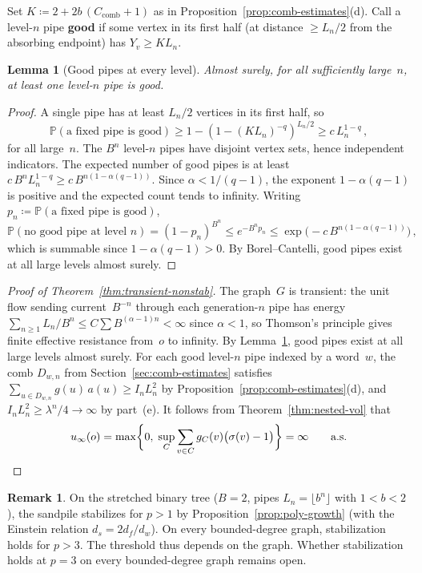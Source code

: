 \documentclass[aop]{imsart}
\theoremstyle{plain}
\newtheorem{lemma}[theorem]{Lemma}
\theoremstyle{definition}
\newtheorem{remark}[theorem]{Remark}
\renewcommand{\P}{\mathbb{P}}
\begin{document}
	Set $K\coloneqq 2+2b\,(C_{\mathrm{comb}}+1)$ as in Proposition~\ref{prop:comb-estimates}(d). Call a level-$n$ pipe \textbf{good} if some vertex in its first half (at distance $\geq L_n/2$ from the absorbing endpoint) has $Y_v\geq KL_n$.
	
	\begin{lemma}[Good pipes at every level]\label{lem:tr-good}
		Almost surely, for all sufficiently large~$n$, at least one level-$n$ pipe is good.
	\end{lemma}
	
	\begin{proof}
		A single pipe has at least $L_n/2$ vertices in its first half, so
		\[
		\P(\text{a fixed pipe is good})
		\geq 1-(1-(KL_n)^{-q})^{L_n/2}
		\geq c\,L_n^{1-q}\,,
		\]
		for all large~$n$. The $B^n$ level-$n$ pipes have disjoint vertex sets, hence independent indicators. The expected number of good pipes is at least $c\,B^n L_n^{1-q}\geq c\,B^{n(1-\alpha(q-1))}$. Since $\alpha<1/(q{-}1)$, the exponent $1-\alpha(q{-}1)$ is positive and the expected count tends to infinity. Writing $p_n\coloneqq\P(\text{a fixed pipe is good})$,
		\[
		\P(\text{no good pipe at level }n)
		=(1-p_n)^{B^n}
		\leq e^{-B^n p_n}
		\leq\exp\bigl(-c\,B^{n(1-\alpha(q-1))}\bigr)\,,
		\]
		which is summable since $1-\alpha(q{-}1)>0$. By Borel--Cantelli, good pipes exist at all large levels almost surely.
	\end{proof}
	
	\begin{proof}[Proof of Theorem~\ref{thm:transient-nonstab}]
		The graph~$G$ is transient: the unit flow sending current~$B^{-n}$ through each generation-$n$ pipe has energy $\sum_{n\geq 1}L_n/B^n\leq C\sum B^{(\alpha-1)n}<\infty$ since $\alpha<1$, so Thomson's principle \citep[Section~2.4]{LP16} gives finite effective resistance from~$o$ to infinity. By Lemma~\ref{lem:tr-good}, good pipes exist at all large levels almost surely. For each good level-$n$ pipe indexed by a word~$w$, the comb $D_{w,n}$ from Section~\ref{sec:comb-estimates} satisfies $\sum_{u\in D_{w,n}}g(u)\,a(u)\geq I_n L_n^2$ by Proposition~\ref{prop:comb-estimates}(d), and $I_n L_n^2\geq\lambda^n/4\to\infty$ by part~(e). It follows from Theorem~\ref{thm:nested-vol} that
		\[
		u_\infty(o)
		=\max\biggl\{0,\;\sup_C\sum_{v\in C} g_C(v)\bigl(\sigma(v)-1\bigr)\biggr\}
		=\infty\qquad\text{a.s.}\qedhere
		\]
	\end{proof}
	
	\begin{remark}
		On the stretched binary tree ($B=2$, pipes $L_n=\lfloor b^n\rfloor$ with $1<b<2$), the sandpile stabilizes for $p>1$ by Proposition~\ref{prop:poly-growth} (with the Einstein relation $d_s=2d_f/d_w$). On every bounded-degree graph, stabilization holds for $p>3$. The threshold thus depends on the graph. Whether stabilization holds at $p=3$ on every bounded-degree graph remains open.
	\end{remark}
	
\end{document}
